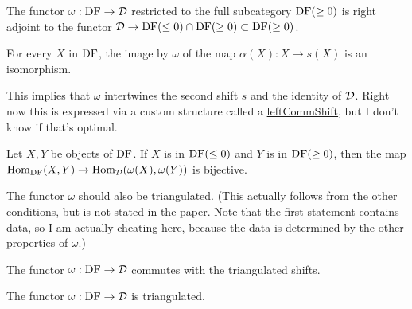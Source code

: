 \begin{definition}
\label{def-FF-rightAdjoint}

The functor $\omega:\operatorname{DF}\to\mathcal{D}$ restricted to the full subcategory $\operatorname{DF}(\ge 0)$ is right adjoint to 
the functor $\mathcal{D} \to \operatorname{DF}(\le 0)\cap\operatorname{DF}(\ge 0)\subset\operatorname{DF}(\ge 0)$.

\end{definition}

\begin{proposition}
\label{prop-FF-shift}

For every $X$ in $\operatorname{DF}$, the image by $\omega$ of the map $\alpha(X) : X \to s(X)$ is an
isomorphism. 

\end{proposition}

This implies that $\omega$ intertwines the second shift $s$ and the identity of $\mathcal{D}$.
Right now this is expressed via a custom structure called a \url{leftCommShift}, but I 
don't know if that's optimal.


\begin{proposition}
\label{prop-FF-ff}

Let $X,Y$ be objects of $\operatorname{DF}$. If $X$ is in $\operatorname{DF}(\le 0)$ and $Y$ is in $\operatorname{DF}(\ge 0)$,
then the map $\operatorname{Hom}_{\operatorname{DF}}(X,Y) \to\operatorname{Hom}_{\mathcal{D}}(\omega(X),\omega(Y))$ is bijective.

\end{proposition}

The functor $\omega$ should also be triangulated.
(This actually follows from the other conditions, but is
not stated in the paper. Note that the first statement contains
data, so I am actually cheating here, because the data is determined
by the other properties of $\omega$.)

\begin{definition}
\label{def-FF-commShift}

The functor $\omega:\operatorname{DF}\to\mathcal{D}$ commutes with the triangulated shifts.

\end{definition}

\begin{proposition}
\label{prop-FF-tri}

The functor $\omega:\operatorname{DF}\to\mathcal{D}$ is triangulated.

\end{proposition}

